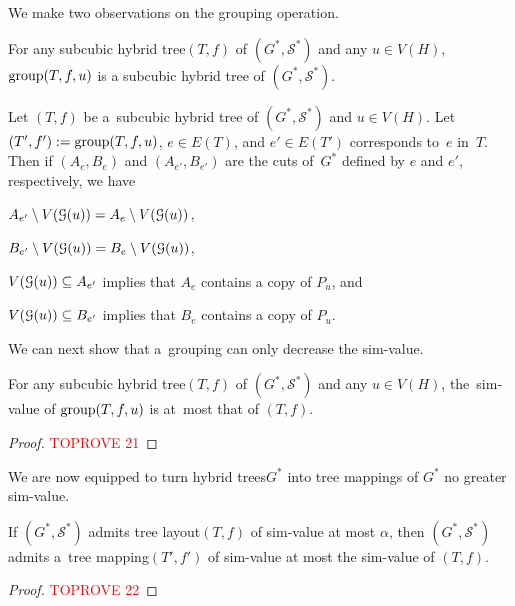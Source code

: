 \documentclass[a4paper,UKenglish,cleveref,hyperref,autoref]{lipics-v2021}
\newcommand{\tmap}{tree mapping\xspace}
\newcommand{\tmaps}{tree mappings\xspace}
\newcommand{\htree}{hybrid tree\xspace}
\newcommand{\htrees}{hybrid trees\xspace}
\begin{document}
We make two observations on the grouping operation.

\begin{observation}\label{obs:subcubic}
For any subcubic \htree $(T, f)$ of $(G^*, \mathcal S^*)$ and any $u \in V(H)$, $\text{group}(T, f, u)$ is a subcubic \htree of $(G^*, \mathcal S^*)$. 
\end{observation}

\begin{observation}\label{rmk:corresponding-cuts}
Let $(T, f)$ be a~subcubic \htree of $(G^*, \mathcal S^*)$ and $u \in V(H)$.
Let $(T', f') := \text{group}(T, f, u)$, $e \in E(T)$, and $e' \in E(T')$ corresponds to~$e$ in~$T$.
Then if $(A_e, B_e)$ and $(A_{e'}, B_{e'})$ are the cuts of~$G^*$ defined by $e$ and $e'$, respectively, we have
\begin{compactitem}
	\item $A_{e'} \setminus V(\mathcal G(u)) = A_e \setminus V(\mathcal G(u))$, 
	\item $B_{e'} \setminus V(\mathcal G(u)) = B_e \setminus V(\mathcal G(u))$, 
	\item $V(\mathcal G(u)) \subseteq A_{e'}$ implies that $A_e$ contains a copy of $P_u$, and 
        \item $V(\mathcal G(u)) \subseteq B_{e'}$ implies that $B_e$ contains a copy of $P_u$.
\end{compactitem}
\end{observation}

We can next show that a~grouping can only decrease the sim-value. 

\begin{lemma}\label{lem:dec-sim-value}
For any subcubic \htree $(T, f)$ of $(G^*, \mathcal S^*)$ and any $u \in V(H)$, the~sim-value of $\text{group}(T, f, u)$ is at~most that of $(T, f)$.
\end{lemma}
\begin{proof}\textcolor{red}{TOPROVE 21}\end{proof}

We are now equipped to turn \htrees $G^*$ into \tmaps of $G^*$ no greater sim-value.





\begin{lemma}\label{lem:htree-to-tmap}
  If  $(G^*, \mathcal S^*)$ admits tree layout$(T,f)$ of sim-value at most $\alpha$, then $(G^*, \mathcal S^*)$ admits a~\tmap $(T',f')$ of sim-value at most the sim-value of $(T,f)$.
\end{lemma}
\begin{proof}\textcolor{red}{TOPROVE 22}\end{proof}
\end{document}

